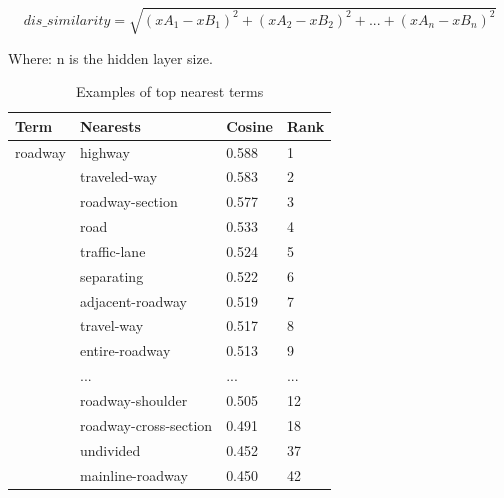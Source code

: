 \documentclass[Journal, InsideFigs, DoubleSpace]{ascelike} %
\begin{document}
\begin{equation}
\label{equ:dis_sim}
dis\_similarity =\sqrt{(xA_1-xB_1)^2+(xA_2-xB_2)^2+...+(xA_n-xB_n)^2}
\end{equation}

Where: n is the hidden layer size.
%
\begin{table} [t]
	\caption{Examples of top nearest terms}
	\label{table:nearest_example}
	\centering
	\small
	\renewcommand{\arraystretch}{1.25}
	\begin{tabular}{l l l  l}
		\hline
		\textbf{Term} & \textbf{Nearests} & \textbf{Cosine} &\textbf{Rank}\\
		\hline
		roadway			& highway & 0.588 & 1\\
		& traveled-way & 0.583 & 2\\
		& roadway-section & 0.577 & 3\\
		& road & 0.533 & 4\\
		& traffic-lane & 0.524 &5\\
		& separating & 0.522 &6\\
		& adjacent-roadway & 0.519 & 7\\
		& travel-way & 0.517 & 8\\
		& entire-roadway & 0.513 & 9\\
		& ...&...& ...\\
		& roadway-shoulder & 0.505 & 12\\
		& roadway-cross-section & 0.491 & 18\\
		& undivided & 0.452 & 37\\
		& mainline-roadway & 0.450 & 42\\
		\hline
	\end{tabular}
	\normalsize
\end{table}
\end{document}
